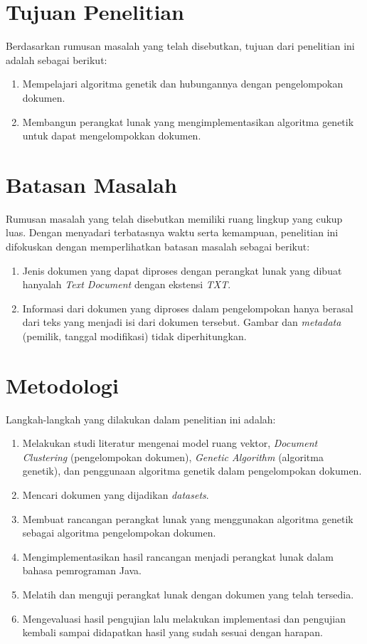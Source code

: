 \section{Tujuan Penelitian}
\label{sec:tujuan}
Berdasarkan rumusan masalah yang telah disebutkan, tujuan dari penelitian ini adalah sebagai berikut:

\begin{enumerate}
	\item Mempelajari algoritma genetik dan hubungannya dengan pengelompokan dokumen.
	\item Membangun perangkat lunak yang mengimplementasikan algoritma genetik untuk dapat mengelompokkan
dokumen.
\end{enumerate}

\section{Batasan Masalah}
\label{sec:batasan}
Rumusan masalah yang telah disebutkan memiliki ruang lingkup yang cukup luas. Dengan menyadari terbatasnya waktu serta kemampuan, penelitian ini difokuskan dengan memperlihatkan batasan masalah sebagai berikut:

\begin{enumerate}
	\item Jenis dokumen yang dapat diproses dengan perangkat lunak yang dibuat hanyalah \textit{Text Document} dengan ekstensi \textit{TXT}.
	\item Informasi dari dokumen yang diproses dalam pengelompokan hanya berasal dari teks yang menjadi isi dari dokumen tersebut. Gambar dan \textit{metadata} (pemilik, tanggal modifikasi) tidak diperhitungkan.
\end{enumerate}


\section{Metodologi}
\label{sec:metlit}
Langkah-langkah yang dilakukan dalam penelitian ini adalah:

\begin{enumerate}
	\item Melakukan studi literatur mengenai model ruang vektor, {\it Document Clustering} (pengelompokan dokumen), {\it Genetic Algorithm} (algoritma genetik), dan penggunaan algoritma genetik dalam pengelompokan dokumen.
	\item Mencari dokumen yang dijadikan {\it datasets}.
	\item Membuat rancangan perangkat lunak yang menggunakan algoritma genetik sebagai algoritma pengelompokan dokumen.
	\item Mengimplementasikan hasil rancangan menjadi perangkat lunak dalam bahasa pemrograman Java.
	\item Melatih dan menguji perangkat lunak dengan dokumen yang telah tersedia.
	\item Mengevaluasi hasil pengujian lalu melakukan implementasi dan pengujian kembali sampai didapatkan hasil yang sudah sesuai dengan harapan.
\end{enumerate}

